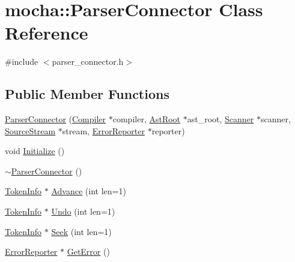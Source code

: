 \hypertarget{classmocha_1_1_parser_connector}{
\section{mocha::ParserConnector Class Reference}
\label{classmocha_1_1_parser_connector}
}


{\ttfamily \#include $<$parser\_\-connector.h$>$}

\subsection*{Public Member Functions}
\begin{DoxyCompactItemize}
\item 
\hyperlink{classmocha_1_1_parser_connector_a82a8adf72d5a6601948b665c422f30b1}{ParserConnector} (\hyperlink{classmocha_1_1_compiler}{Compiler} $\ast$compiler, \hyperlink{classmocha_1_1_ast_root}{AstRoot} $\ast$ast\_\-root, \hyperlink{classmocha_1_1_scanner}{Scanner} $\ast$scanner, \hyperlink{classmocha_1_1_source_stream}{SourceStream} $\ast$stream, \hyperlink{classmocha_1_1_error_reporter}{ErrorReporter} $\ast$reporter)
\begin{DoxyCompactList}\small\item\em \end{DoxyCompactList}\item 
void \hyperlink{classmocha_1_1_parser_connector_a52fc22f0ebcf29e26681099332ebbd73}{Initialize} ()
\item 
\hyperlink{classmocha_1_1_parser_connector_afbd4eaeb7af0f594af0f2b6f16e3756c}{$\sim$ParserConnector} ()
\item 
\hyperlink{classmocha_1_1_token_info}{TokenInfo} $\ast$ \hyperlink{classmocha_1_1_parser_connector_a11ebf98086caa4e95b9b4a0928f0123a}{Advance} (int len=1)
\item 
\hyperlink{classmocha_1_1_token_info}{TokenInfo} $\ast$ \hyperlink{classmocha_1_1_parser_connector_ac86fac993524ff4e5620020514a345a7}{Undo} (int len=1)
\item 
\hyperlink{classmocha_1_1_token_info}{TokenInfo} $\ast$ \hyperlink{classmocha_1_1_parser_connector_a4fed43adca80272da37a38d2bb5c4e96}{Seek} (int len=1)
\item 
\hyperlink{classmocha_1_1_error_reporter}{ErrorReporter} $\ast$ \hyperlink{classmocha_1_1_parser_connector_a04d9dd149ed5c9aff55ec100b1bd6779}{GetError} ()
\end{DoxyCompactItemize}
